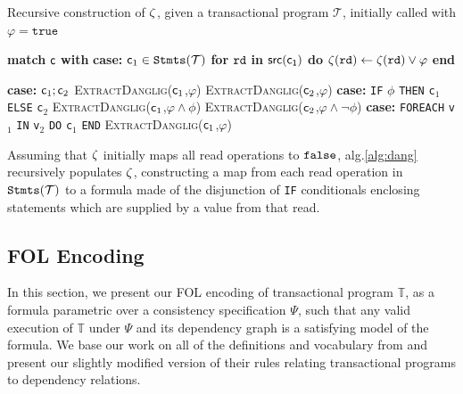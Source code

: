 \documentclass{vldb}
\begin{document}
\begin{algorithm}
\caption{Recursive construction of $\mathtt{\zeta}$, given a transactional program $\mathcal{T}$, initially called with 
$\varphi = \texttt{true} $} \label{alg:dang} 

\begin{algorithmic}[1]
\State \textbf{match} $\mathsf{c}$ \textbf{with}
\State \indent \textbf{case:} $\mathsf{c}_1 \in \mathtt{Stmts}(\mathcal{T})$ 
\State \indent \indent \textbf{for} $\texttt{rd}$ \textbf{in} $\mathsf{src(\mathsf{c}_1)}$ \textbf{do}
\State \indent \indent \indent $\mathtt{\zeta}(\texttt{rd})\gets \mathtt{\zeta}(\texttt{rd}) \vee \varphi $
\State \indent \indent \textbf{end}

\State \indent \textbf{case:} $\mathsf{c}_1;\mathsf{c}_2$ 
\State \indent \indent \textsc{ExtractDanglig}($\mathsf{c}_1$,$\varphi$)
\State \indent \indent \textsc{ExtractDanglig}($\mathsf{c}_2$,$\varphi$)
\State \indent \textbf{case:} \texttt{IF} $\phi$ \texttt{THEN} \texttt{c}$_1$ \texttt{ELSE} \texttt{c}$_2$
\State \indent \indent \textsc{ExtractDanglig}($\mathsf{c}_1$,$\varphi \wedge \phi$)
\State \indent \indent \textsc{ExtractDanglig}($\mathsf{c}_2$,$\varphi \wedge \neg \phi$)
\State \indent \textbf{case:} \texttt{FOREACH} \texttt{v}$_1$ \texttt{IN} \texttt{v}$_2$ \texttt{DO} \texttt{c$_1$} \texttt{END}
\State \indent \indent \textsc{ExtractDanglig}($\mathsf{c}_1$,$\varphi$)


\EndProcedure
\end{algorithmic}
\end{algorithm}



Assuming that $\mathtt{\zeta}$ initially maps all read operations to $\mathtt{false}$,
alg.\ref{alg:dang} recursively populates $\mathtt{\zeta}$, constructing  a
map from each read operation in $\mathtt{Stmts}(\mathcal{T})$
to a formula made of the disjunction of \texttt{IF} conditionals enclosing
statements which are supplied by a value from that read.




\subsection{FOL Encoding}
In this section, we present our FOL encoding of transactional
program $\mathbb{T}$, as a formula parametric over a consistency specification $\Psi$, such
that any valid execution of $\mathbb{T}$ under $\Psi$ and its 
dependency graph is a satisfying model of the formula. We base our work on all of
the definitions and vocabulary from \cite{Nagar:ser} and present our slightly
modified version of their rules relating transactional programs to dependency
relations. 
\end{document}
